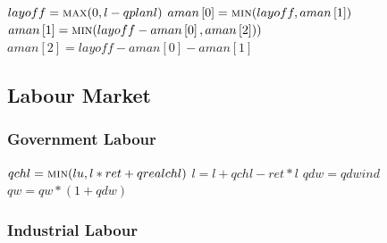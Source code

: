 \documentclass{article}
\begin{document}
\begin{algorithm}[!htbp]
\caption{Handle Layoffs}
    \begin{algorithmic}
        \State \(layoff = \Call{max}{0, l - qplanl}\)
        \State \(aman\left[0\right] = \Call{min}{layoff, aman\left[1\right]}\)
        \State \(aman\left[1\right] = \Call{min}{layoff - aman\left[0\right], aman\left[2\right]})\)
        \State \(aman\left[2\right] = layoff - aman\left[0\right] - aman\left[1\right]\)
        \EndFunction
    \end{algorithmic}
\end{algorithm}


\subsection{Labour Market}

\begin{algorithm}[H]
\caption{Labour Market}
    \begin{algorithmic}
        \State {}
        \State {}
        \State {}
        \EndFor
        \EndFunction
    \end{algorithmic}
\end{algorithm}

\subsubsection{Government Labour}

\begin{algorithm}[H]
\caption{Glabour}
    \begin{algorithmic}
        \State \(qchl = \Call{min}{lu, l * ret + qrealchl}\)
        \State \(l = l + qchl - ret * l\)
        \State \(qdw = qdwind\)
        \State \(qw = qw * (1 + qdw)\)
        \EndFunction
    \end{algorithmic}
\end{algorithm}

\subsubsection{Industrial Labour}

\begin{algorithm}[H]
\caption{Indlabour}
    \begin{algorithmic}
        \State {}
        \State {}
        \EndFunction
    \end{algorithmic}
\end{algorithm}
\end{document}
